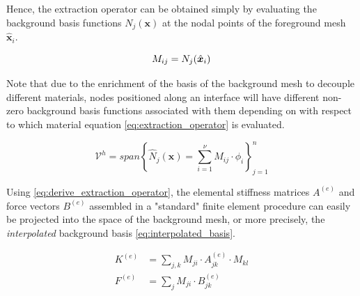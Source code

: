 Hence, the extraction operator can be obtained simply by evaluating the background basis functions $N_j(\bm{x})$ at the nodal points of the foreground mesh $\hat{\bm{x}}_i$.

\begin{equation}
\label{eq:extraction_operator}
    M_{ij} =  N_j(\hat{\bm{x}}_i)\\
\end{equation}

Note that due to the enrichment of the basis of the background mesh to decouple different materials, nodes positioned along an interface will have different non-zero background basis functions associated with them depending on with respect to which material equation \eqref{eq:extraction_operator} is evaluated.  

\begin{equation}
\label{eq:interpolated_basis}
    \mathcal{V}^h = span\left\{ 
        \widehat{N}_j(\bm{x}) = \sum_{i=1}^{\nu} M_{ij} \cdot \phi_i
    \right\}_{j=1}^{n}
\end{equation}

Using \eqref{eq:derive_extraction_operator}, the elemental stiffness matrices $A^{(e)}$ and force vectors $B^{(e)}$ assembled in a "standard" finite element procedure can easily be projected into the space of the background mesh, or more precisely, the \emph{interpolated} background basis \eqref{eq:interpolated_basis}.

\begin{equation}
    \label{eq:transform_elemental}
    \begin{split}
        K^{(e)} &= \sum_{j,k} M_{ji} \cdot A^{(e)}_{jk} \cdot M_{kl} \\
        F^{(e)} &= \sum_{j} M_{ji} \cdot B^{(e)}_{jk}  \\
    \end{split}
\end{equation}